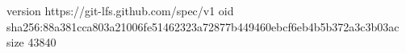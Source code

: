 version https://git-lfs.github.com/spec/v1
oid sha256:88a381cca803a21006fe51462323a72877b449460ebcf6eb4b5b372a3c3b03ac
size 43840
